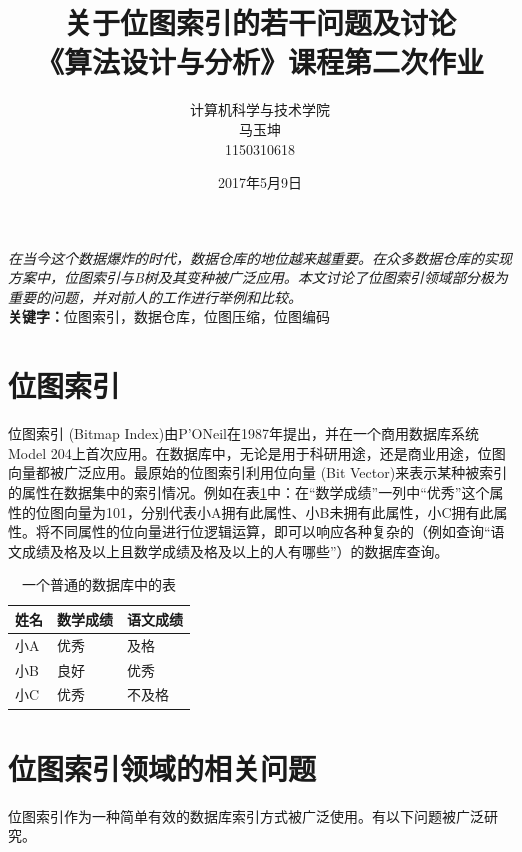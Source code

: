 \documentclass[11pt, a4paper]{article}
\begin{document}
\title{{\bf\Huge 关于位图索引的若干问题及讨论} \\[2ex]{\huge 《算法设计与分析》课程第二次作业}}
  \author{计算机科学与技术学院\\马玉坤\\1150310618}
  \date{2017年5月9日}
  \maketitle

  \emph{在当今这个数据爆炸的时代，数据仓库的地位越来越重要。在众多数据仓库的实现方案中，位图索引与B树及其变种被广泛应用。本文讨论了位图索引领域部分极为重要的问题，并对前人的工作进行举例和比较。}\\
  {\bf 关键字：}位图索引，数据仓库，位图压缩，位图编码

  \tableofcontents

  \section{位图索引}

  位图索引 (Bitmap Index)由P’ONeil在1987年提出，并在一个商用数据库系统Model 204上首次应用。在数据库中，无论是用于科研用途，还是商业用途，位图向量都被广泛应用。\cite{art3}最原始的位图索引利用位向量 (Bit Vector)来表示某种被索引的属性在数据集中的索引情况。例如在表\ref{tb:table}中：在“数学成绩”一列中“优秀”这个属性的位图向量为101，分别代表小A拥有此属性、小B未拥有此属性，小C拥有此属性。将不同属性的位向量进行位逻辑运算，即可以响应各种复杂的（例如查询“语文成绩及格及以上且数学成绩及格及以上的人有哪些”）的数据库查询。

  \begin{table}[H]
    \centering
    \begin{tabular}{|l|l|l|}
      \hline
      姓名 & 数学成绩 & 语文成绩 \\ \hline
      小A & 优秀   & 及格   \\ \hline
      小B & 良好   & 优秀   \\ \hline
      小C & 优秀   & 不及格 \\ \hline
    \end{tabular}
    \label{tb:table} \caption{一个普通的数据库中的表}
  \end{table}

  \section{位图索引领域的相关问题}

  位图索引作为一种简单有效的数据库索引方式被广泛使用。有以下问题被广泛研究。
\end{document}
